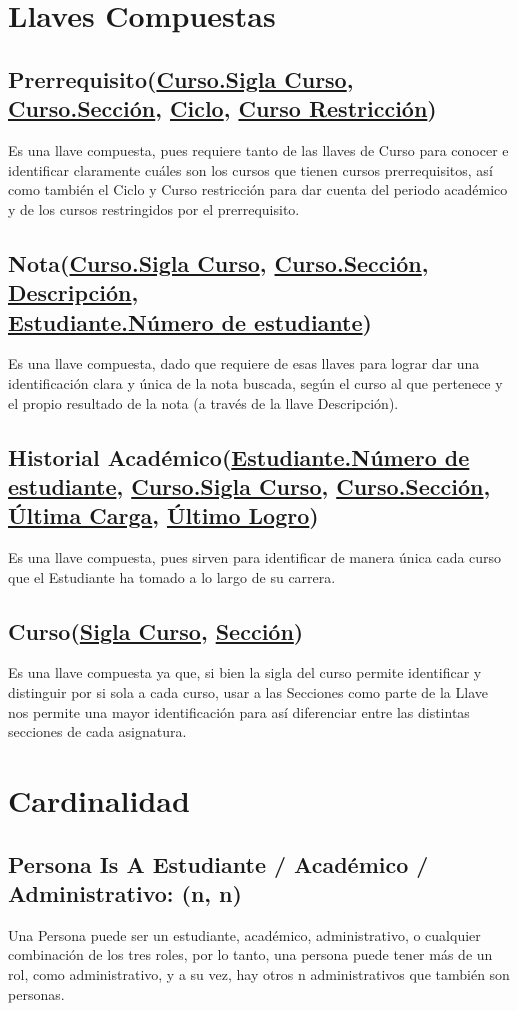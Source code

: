 \documentclass[12pt]{article}
\begin{document}
\section*{Llaves Compuestas}
\subsection*{Prerrequisito(\underline{Curso.Sigla Curso}, \underline{Curso.Sección}, \underline{Ciclo}, \underline{Curso Restricción})}
Es una llave compuesta, pues requiere tanto de las llaves de Curso para conocer e identificar claramente 
cuáles son los cursos que tienen cursos prerrequisitos, así como también el Ciclo y Curso restricción para dar cuenta del periodo académico y de los cursos restringidos por el prerrequisito. 
\subsection*{Nota(\underline{Curso.Sigla Curso}, \underline{Curso.Sección}, \underline{Descripción}, 
\\ \underline{Estudiante.Número de estudiante})}
Es una llave compuesta, dado que requiere de esas llaves para lograr dar una identificación clara y única de la nota buscada, según el curso al que pertenece y el propio resultado de la nota (a través de la llave Descripción). 
\subsection*{Historial Académico(\underline{Estudiante.Número de estudiante}, \underline{Curso.Sigla Curso}, \underline{Curso.Sección}, \underline{Última Carga}, \underline{Último Logro})}
Es una llave compuesta, pues sirven para identificar de manera única cada curso que el Estudiante ha tomado a lo largo de su carrera. 
\subsection*{Curso(\underline{Sigla Curso}, \underline{Sección})}
Es una llave compuesta ya que, si bien la sigla del curso permite identificar y distinguir por si sola a cada curso, usar a las Secciones como parte de la Llave nos permite una mayor identificación para así diferenciar entre las distintas secciones de cada asignatura.  
\newpage
\section*{Cardinalidad}
\subsection*{Persona Is A Estudiante / Académico / Administrativo: (n, n)}
Una Persona puede ser un estudiante, académico, administrativo, o cualquier combinación de los tres roles, por lo tanto, una persona puede tener más de un rol, como administrativo, 
y a su vez, hay otros n administrativos que también son personas. 
\end{document}
